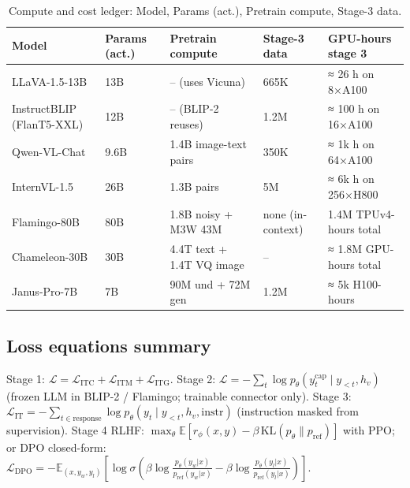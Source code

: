 \documentclass{article}
\begin{document}
\begin{table}[t]
\centering
\caption{Compute and cost ledger: Model, Params (act.), Pretrain compute, Stage-3 data.}
\label{tab:compute-and-cost-ledger}
\begin{tabular}{>{\raggedright\arraybackslash}p{0.2358\linewidth}
  >{\raggedright\arraybackslash}p{0.1604\linewidth}
  >{\raggedright\arraybackslash}p{0.2358\linewidth}
  >{\raggedright\arraybackslash}p{0.1604\linewidth}
  >{\raggedright\arraybackslash}p{0.2075\linewidth}}
\toprule
\textbf{Model} & \textbf{Params (act.)} & \textbf{Pretrain compute} & \textbf{Stage-3 data} & \textbf{GPU-hours stage 3} \\
\midrule
LLaVA-1.5-13B & 13B & -- (uses Vicuna) & 665K & ≈ 26 h on 8×A100 \\
InstructBLIP (FlanT5-XXL) & 12B & -- (BLIP-2 reuses) & 1.2M & ≈ 100 h on 16×A100 \\
Qwen-VL-Chat & 9.6B & 1.4B image-text pairs & 350K & ≈ 1k h on 64×A100 \\
InternVL-1.5 & 26B & 1.3B pairs & 5M & ≈ 6k h on 256×H800 \\
Flamingo-80B & 80B & 1.8B noisy + M3W 43M & none (in-context) & 1.4M TPUv4-hours total \\
Chameleon-30B & 30B & 4.4T text + 1.4T VQ image & -- & ≈ 1.8M GPU-hours total \\
Janus-Pro-7B & 7B & 90M und + 72M gen & 1.2M & ≈ 5k H100-hours \\
\end{tabular}
\end{table}

\subsection{Loss equations summary}\label{loss-equations-summary}

Stage 1: \(\mathcal{L} = \mathcal{L}_{\text{ITC}} + \mathcal{L}_{\text{ITM}} + \mathcal{L}_{\text{ITG}}\).
Stage 2: \(\mathcal{L} = -\sum_t \log p_\theta(y_t^{\text{cap}} \mid y_{<t}, h_v)\) (frozen LLM in BLIP-2 / Flamingo; trainable connector only).
Stage 3: \(\mathcal{L}_{\text{IT}} = -\sum_{t \in \text{response}} \log p_\theta(y_t \mid y_{<t}, h_v, \text{instr})\) (instruction masked from supervision).
Stage 4 RLHF: \(\max_\theta \mathbb{E}[r_\phi(x, y) - \beta \, \text{KL}(p_\theta \| p_{\text{ref}})]\) with PPO; or DPO closed-form: \(\mathcal{L}_{\text{DPO}} = -\mathbb{E}_{(x,y_w,y_l)}\left[\log \sigma\!\left(\beta \log \frac{p_\theta(y_w|x)}{p_{\text{ref}}(y_w|x)} - \beta \log \frac{p_\theta(y_l|x)}{p_{\text{ref}}(y_l|x)}\right)\right]\).
\end{document}

